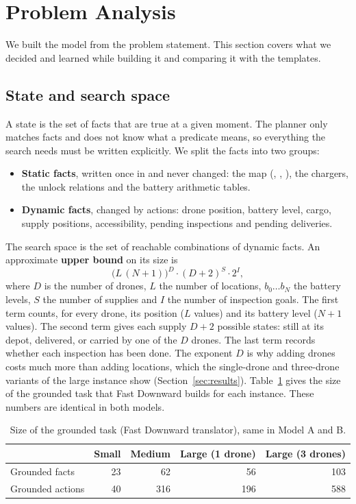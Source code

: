 \documentclass[11pt,a4paper]{article}
\newcommand{\p}[1]{\texttt{\detokenize{#1}}}
\begin{document}
\section{Problem Analysis}
\label{sec:analysis}
We built the model from the problem statement. This section covers what we decided and learned while building it and comparing it with the templates.

\subsection{State and search space}
\label{sec:searchspace}
A state is the set of facts that are true at a given moment. The planner only
matches facts and does not know what a predicate means, so everything the
search needs must be written explicitly. We split the facts into two groups:
\begin{itemize}
  \item \textbf{Static facts}, written once in \p{:init} and never changed:
    the map (\p{connected}, \p{flight_cost}, \p{distance}), the chargers, the
    unlock relations and the battery arithmetic tables.
  \item \textbf{Dynamic facts}, changed by actions: drone position, battery
    level, cargo, supply positions, accessibility, pending inspections and
    pending deliveries.
\end{itemize}
The search space is the set of reachable combinations of dynamic facts. An
approximate \textbf{upper bound} on its size is
\[
  \big(L\,(N{+}1)\big)^{D}\cdot (D{+}2)^{S}\cdot 2^{I},
\]
where $D$ is the number of drones, $L$ the number of locations, $b_0 \ldots
b_N$ the battery levels, $S$ the number of supplies and $I$ the number of
inspection goals. The first term counts, for every drone, its position ($L$
values) and its battery level ($N{+}1$ values). The second term gives each
supply $D{+}2$ possible states: still at its depot, delivered, or carried by
one of the $D$ drones. The last term records whether each inspection has been
done. The exponent $D$ is
why adding drones costs much more than adding locations, which the single-drone
and three-drone variants of the large instance show (Section~\ref{sec:results}).
Table~\ref{tab:grounding} gives the size of the grounded task that Fast
Downward builds for each instance. These numbers are identical in both models.

\begin{table}[h]
  \centering\small
  \begin{tabular}{lrrrr}
    \toprule
    & Small & Medium & Large (1 drone) & Large (3 drones) \\
    \midrule
    Grounded facts   & 23 & 62  & 56  & 103 \\
    Grounded actions & 40 & 316 & 196 & 588 \\
    \bottomrule
  \end{tabular}
  \caption{Size of the grounded task (Fast Downward translator), same in Model A and B.}
  \label{tab:grounding}
\end{table}
\end{document}

